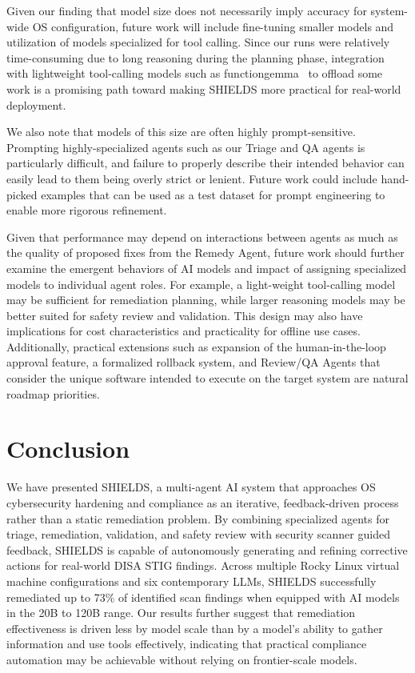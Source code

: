 \documentclass[pdflatex,sn-mathphys-num]{sn-jnl}%
\begin{document}
Given our finding that model size does not necessarily imply accuracy for system-wide OS configuration, future work will include fine-tuning smaller models and utilization of models specialized for tool calling. Since our runs were relatively time-consuming due to long reasoning during the planning phase, integration with lightweight tool-calling models such as functiongemma~\cite{functiongemma} to offload some work is a promising path toward making SHIELDS more practical for real-world deployment.

We also note that models of this size are often highly prompt-sensitive. Prompting highly-specialized agents such as our Triage and QA agents is particularly difficult, and failure to properly describe their intended behavior can easily lead to them being overly strict or lenient. Future work could include hand-picked examples that can be used as a test dataset for prompt engineering to enable more rigorous refinement.

Given that performance may depend on interactions between agents as much as the quality of proposed fixes from the Remedy Agent, future work should further examine the emergent behaviors of AI models and impact of assigning specialized models to individual agent roles. For example, a light-weight tool-calling model may be sufficient for remediation planning, while larger reasoning models may be better suited for safety review and validation. This design may also have implications for cost characteristics and practicality for offline use cases. Additionally, practical extensions such as expansion of the human-in-the-loop approval feature, a formalized rollback system, and Review/QA Agents that consider the unique software intended to execute on the target system are natural roadmap priorities.

\section{Conclusion}\label{sec:conclusion}

We have presented SHIELDS, a multi-agent AI system that approaches OS cybersecurity hardening and compliance as an iterative, feedback-driven process rather than a static remediation problem. By combining specialized agents for triage, remediation, validation, and safety review with security scanner guided feedback, SHIELDS is capable of autonomously generating and refining corrective actions for real-world DISA STIG findings. Across multiple Rocky Linux virtual machine configurations and six contemporary LLMs, SHIELDS successfully remediated up to 73\% of identified scan findings when equipped with AI models in the 20B to 120B range. Our results further suggest that remediation effectiveness is driven less by model scale than by a model's ability to gather information and use tools effectively, indicating that practical compliance automation may be achievable without relying on frontier-scale models.
\end{document}
